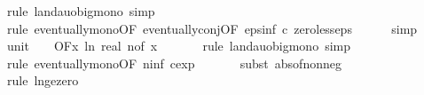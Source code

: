 \begin{isabellebody}
\ {\isacharparenleft}{\kern0pt}rule\ landau{\isacharunderscore}{\kern0pt}o{\isachardot}{\kern0pt}big{\isacharunderscore}{\kern0pt}mono{\isacharcomma}{\kern0pt}\ simp{\isacharparenright}{\kern0pt}\isanewline
\ \ \ \ \isamarkupfalse%
\ {\isacharparenleft}{\kern0pt}rule\ eventually{\isacharunderscore}{\kern0pt}mono{\isacharbrackleft}{\kern0pt}OF\ eventually{\isacharunderscore}{\kern0pt}conj{\isacharbrackleft}{\kern0pt}OF\ eps{\isacharunderscore}{\kern0pt}inf{\isacharbrackleft}{\kern0pt}\ c{\isacharequal}{\kern0pt}{\isachardoublequoteopen}{}{\isachardoublequoteclose}{\isacharbrackright}{\kern0pt}\ zero{\isacharunderscore}{\kern0pt}less{\isacharunderscore}{\kern0pt}eps{\isacharbrackright}{\kern0pt}{\isacharbrackright}{\kern0pt}{\isacharparenright}{\kern0pt}\isanewline
\ \ \ \ \isamarkupfalse%
\ simp\isanewline
\isanewline
\ \ \isamarkupfalse%
\ unit{\isacharunderscore}{\kern0pt}{}{\isacharcolon}{\kern0pt}\ {\isachardoublequoteopen}{\isacharparenleft}{\kern0pt}{\isasymlambda}{\isacharunderscore}{\kern0pt}{\isachardot}{\kern0pt}\ {}{\isacharparenright}{\kern0pt}\ {\isasymin}\ O{\isacharbrackleft}{\kern0pt}{\isacharquery}{\kern0pt}F{\isacharbrackright}{\kern0pt}{\isacharparenleft}{\kern0pt}{\isasymlambda}x{\isachardot}{\kern0pt}\ ln\ {\isacharparenleft}{\kern0pt}real\ {\isacharparenleft}{\kern0pt}n{\isacharunderscore}{\kern0pt}of\ x{\isacharparenright}{\kern0pt}{\isacharparenright}{\kern0pt}{\isacharparenright}{\kern0pt}{\isachardoublequoteclose}\ \isanewline
\ \ \ \ \isamarkupfalse%
\ {\isacharparenleft}{\kern0pt}rule\ landau{\isacharunderscore}{\kern0pt}o{\isachardot}{\kern0pt}big{\isacharunderscore}{\kern0pt}mono{\isacharcomma}{\kern0pt}\ simp{\isacharparenright}{\kern0pt}\isanewline
\ \ \ \ \isamarkupfalse%
\ {\isacharparenleft}{\kern0pt}rule\ eventually{\isacharunderscore}{\kern0pt}mono{\isacharbrackleft}{\kern0pt}OF\ n{\isacharunderscore}{\kern0pt}inf{\isacharbrackleft}{\kern0pt}\ c{\isacharequal}{\kern0pt}{\isachardoublequoteopen}exp\ {}{\isachardoublequoteclose}{\isacharbrackright}{\kern0pt}{\isacharbrackright}{\kern0pt}{\isacharparenright}{\kern0pt}\isanewline
\ \ \ \ \isamarkupfalse%
\ {\isacharparenleft}{\kern0pt}subst\ abs{\isacharunderscore}{\kern0pt}of{\isacharunderscore}{\kern0pt}nonneg{\isacharparenright}{\kern0pt}\isanewline
\ \ \ \ \isamarkupfalse%
\ {\isacharparenleft}{\kern0pt}rule\ ln{\isacharunderscore}{\kern0pt}ge{\isacharunderscore}{\kern0pt}zero{\isacharparenright}{\kern0pt}\isanewline

\end{isabellebody}
